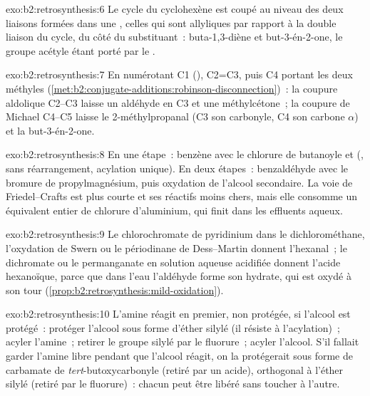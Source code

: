 \begin{solution}{exo:b2:retrosynthesis:6}
Le cycle du cyclohexène est coupé au niveau des deux liaisons  formées dans une , celles qui sont allyliques par rapport à la double liaison du cycle, du côté du
substituant~: buta-1,3-diène et but-3-én-2-one, le groupe acétyle étant porté par le .
\end{solution}

\begin{solution}{exo:b2:retrosynthesis:7}
En numérotant C1 (), C2=C3, puis C4 portant les deux méthyles
(\cref{met:b2:conjugate-additions:robinson-disconnection})~: la coupure aldolique C2--C3 laisse un
aldéhyde en C3 et une méthylcétone~; la coupure de Michael C4--C5 laisse le 2-méthylpropanal (C3 son
carbonyle, C4 son carbone $\alpha$) et la but-3-én-2-one.
\end{solution}

\begin{solution}{exo:b2:retrosynthesis:8}
En une étape~: benzène avec le chlorure de butanoyle et  (, sans
réarrangement, acylation unique). En deux étapes~: benzaldéhyde avec le bromure de propylmagnésium, puis
oxydation de l'alcool secondaire. La voie de Friedel--Crafts est plus courte et ses réactifs moins chers,
mais elle consomme un équivalent entier de chlorure d'aluminium, qui finit dans les effluents aqueux.
\end{solution}

\begin{solution}{exo:b2:retrosynthesis:9}
Le chlorochromate de pyridinium dans le dichlorométhane, l'oxydation de Swern ou le périodinane de
Dess--Martin donnent l'hexanal~; le dichromate ou le permanganate en solution aqueuse acidifiée donnent
l'acide hexanoïque, parce que dans l'eau l'aldéhyde forme son hydrate, qui est oxydé à son tour
(\cref{prop:b2:retrosynthesis:mild-oxidation}).
\end{solution}

\begin{solution}{exo:b2:retrosynthesis:10}
L'amine réagit en premier, non protégée, si l'alcool est protégé~: protéger l'alcool sous forme d'éther
silylé (il résiste à l'acylation)~; acyler l'amine~; retirer le groupe silylé par le fluorure~; acyler
l'alcool. S'il fallait garder l'amine libre pendant que l'alcool réagit, on la protégerait sous forme de
carbamate de \textit{tert}-butoxycarbonyle (retiré par un acide), orthogonal à l'éther silylé (retiré par
le fluorure)~: chacun peut être libéré sans toucher à l'autre.
\end{solution}

